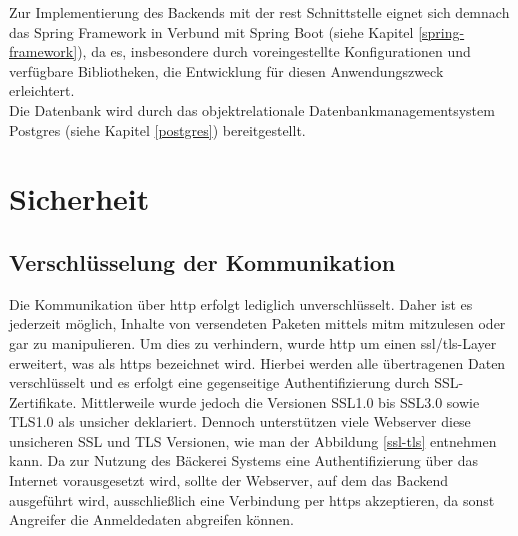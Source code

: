 Zur Implementierung des Backends mit der \gls{rest} Schnittstelle eignet sich demnach das Spring Framework in Verbund mit Spring Boot (siehe Kapitel \ref{spring-framework}), da es, insbesondere durch voreingestellte Konfigurationen und verfügbare Bibliotheken, die Entwicklung für diesen Anwendungszweck erleichtert. 
\\
Die Datenbank wird durch das objektrelationale Datenbankmanagementsystem Postgres (siehe Kapitel \ref{postgres}) bereitgestellt.

\clearpage

\section{Sicherheit}

\subsection{Verschlüsselung der Kommunikation}
Die Kommunikation über \gls{http} erfolgt lediglich unverschlüsselt.
Daher ist es jederzeit möglich, Inhalte von versendeten Paketen mittels \gls{mitm} mitzulesen oder gar zu manipulieren.
Um dies zu verhindern, wurde \gls{http} um einen \gls{ssl}/\gls{tls}-Layer erweitert, was als \gls{https} bezeichnet wird.
Hierbei werden alle übertragenen Daten verschlüsselt und es erfolgt eine gegenseitige Authentifizierung durch SSL-Zertifikate.
Mittlerweile wurde jedoch die Versionen SSL1.0 bis SSL3.0 sowie TLS1.0 als unsicher deklariert.
Dennoch unterstützen viele Webserver diese unsicheren SSL und TLS Versionen, wie man der Abbildung \ref{ssl-tls} entnehmen kann.
Da zur Nutzung des Bäckerei Systems eine Authentifizierung über das Internet vorausgesetzt wird, sollte der Webserver, auf dem das Backend ausgeführt wird, ausschließlich eine Verbindung per \gls{https} akzeptieren, da sonst Angreifer die Anmeldedaten abgreifen können. 


\clearpage

